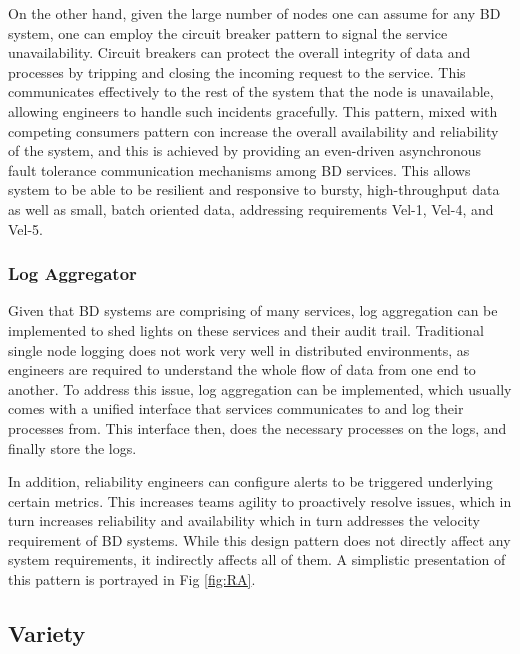 \documentclass[a4paper,11pt,article,oneside]{memoir}
\begin{document}
On the other hand, given the large number of nodes one can assume for any BD system, one can employ the circuit breaker pattern to signal the service unavailability. Circuit breakers can protect the overall integrity of data and processes by tripping and closing the incoming request to the service. This communicates effectively to the rest of the system that the node is unavailable, allowing engineers to handle such incidents gracefully. This pattern, mixed with competing consumers pattern con increase the overall availability and reliability of the system, and this is achieved by providing an even-driven asynchronous fault tolerance communication mechanisms among BD services. This allows system to be able to be resilient and responsive to bursty, high-throughput data as well as small, batch oriented data, addressing requirements Vel-1, Vel-4, and Vel-5. 
    
\subsubsection{Log Aggregator}

Given that BD systems are comprising of many services, log aggregation can be implemented to shed lights on these services and their audit trail. Traditional single node logging does not work very well in distributed environments, as engineers are required to understand the whole flow of data from one end to another. To address this issue, log aggregation can be implemented, which usually comes with a unified interface that services communicates to and log their processes from. This interface then, does the necessary processes on the logs, and finally store the logs. 

In addition, reliability engineers can configure alerts to be triggered underlying certain metrics. This increases teams agility to proactively resolve issues, which in turn increases reliability and availability which in turn addresses the velocity requirement of BD systems. While this design pattern does not directly affect any system requirements, it indirectly affects all of them. A simplistic presentation of this pattern is portrayed in Fig \ref{fig:RA}. 




\subsection{Variety}
\end{document}
